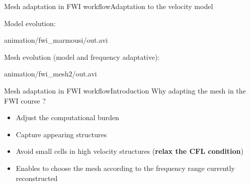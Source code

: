 \begin{frame}{Mesh adaptation in FWI workflow}{Adaptation to the velocity model}
  \begin{block}{Model evolution:}
    \begin{center}
            {animation/fwi_marmousi/out.avi}
    \end{center}
  \end{block}

  \begin{block}{Mesh evolution (model and frequency adaptative):}
    \begin{center}
            {animation/fwi_mesh2/out.avi}
    \end{center}
  \end{block}
\end{frame}



\begin{frame}{Mesh adaptation in FWI workflow}{Introduction}
  Why adapting the mesh in the FWI course ?
  \vspace{1cm}
  \begin{itemize}
  \item<2->{Adjust the computational burden}
  \item<3->{ Capture appearing structures}
  \item<4->{Avoid small cells in high velocity structures (\textbf{relax the CFL condition})}
  \item<5->{Enables to choose the mesh according to the frequency range currently reconstructed}
  \end{itemize}
\end{frame}


